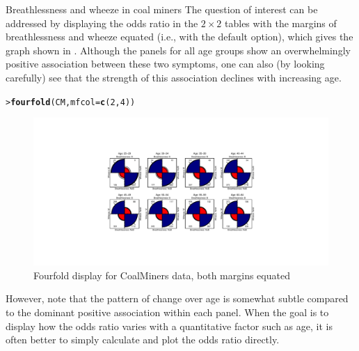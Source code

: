 \documentclass[10pt,krantz2]{krantz}\usepackage[]{graphicx}\usepackage[]{color}
\makeatletter
\newcommand{\hlnum}[1]{\textcolor[rgb]{0.686,0.059,0.569}{#1}}%
\newcommand{\hlstd}[1]{\textcolor[rgb]{0.345,0.345,0.345}{#1}}%
\newcommand{\hlkwc}[1]{\textcolor[rgb]{0.333,0.667,0.333}{#1}}%
\newcommand{\hlkwd}[1]{\textcolor[rgb]{0.737,0.353,0.396}{\textbf{#1}}}%
\newenvironment{kframe}{%
 \def\at@end@of@kframe{}%
 \ifinner\ifhmode%
  \def\at@end@of@kframe{\end{minipage}}%
  \begin{minipage}{\columnwidth}%
 \fi\fi%
 \def\FrameCommand##1{\hskip\@totalleftmargin \hskip-\fboxsep
 \colorbox{shadecolor}{##1}\hskip-\fboxsep
     \hskip-\linewidth \hskip-\@totalleftmargin \hskip\columnwidth}%
 \MakeFramed {\advance\hsize-\width
   \@totalleftmargin\z@ \linewidth\hsize
   \@setminipage}}%
 {\par\unskip\endMakeFramed%
 \at@end@of@kframe}
\newenvironment{knitrout}{}{} %
\renewenvironment{knitrout}{\small\renewcommand{\baselinestretch}{.85}}{} %
\makeatother
\begin{document}
\begin{Example}[wheeze1]{Breathlessness and wheeze in coal miners}
The question of interest
can be addressed by displaying the odds ratio
in the $2 \times 2$ tables with the margins of breathlessness
and wheeze equated (i.e., with the default  option),
which gives the graph shown in .
Although the panels for all age groups show an overwhelmingly
positive association between these two symptoms, one can also
(by looking carefully)
see that the strength of this association declines with increasing
age.

\begin{knitrout}
\color{fgcolor}\begin{kframe}
\begin{alltt}
\hlstd{> }\hlkwd{fourfold}\hlstd{(CM,} \hlkwc{mfcol} \hlstd{=} \hlkwd{c}\hlstd{(}\hlnum{2}\hlstd{,} \hlnum{4}\hlstd{))}
\end{alltt}
\end{kframe}\begin{figure}[!htbp]

\centerline{\includegraphics[width=\textwidth,trim=120 80 120 80]{ch04/fig/coalminer1-1} }

\caption[Fourfold display for CoalMiners data, both margins equated]{Fourfold display for CoalMiners data, both margins equated\label{fig:coalminer1}}
\end{figure}


\end{knitrout}

However, note that the pattern of change over age is somewhat subtle
compared to the dominant positive association within each
panel.
When the goal is to display how the odds ratio varies with
a quantitative factor such as age, it is often better to simply
calculate and plot the odds ratio directly.


\end{Example}
\end{document}
